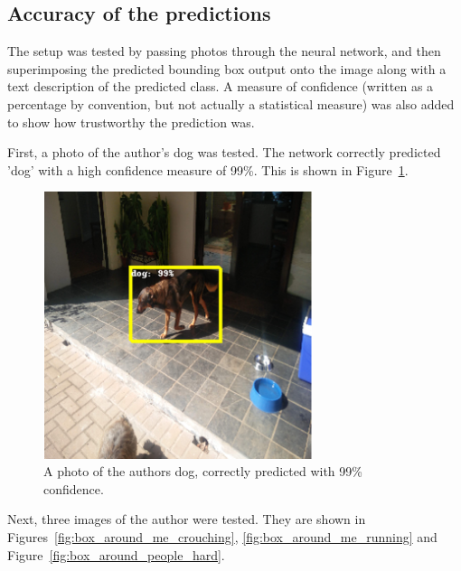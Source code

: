 \subsection{Accuracy of the predictions}

The setup was tested by passing photos through the neural network, and then superimposing the predicted bounding box output onto the image along with a text description of the predicted class. A measure of confidence (written as a percentage by convention, but not actually a statistical measure) was also added to show how trustworthy the prediction was.

First, a photo of the author's dog was tested. The network correctly predicted 'dog' with a high confidence measure of 99\%. This is shown in Figure~\ref{fig:box_around_blossom}.

\begin{figure}[h!]
  \centering
  \includegraphics[width=0.7\textwidth]{methodology/box_around_blossom}
  \caption{\label{fig:box_around_blossom}A photo of the authors dog, correctly predicted with 99\% confidence.}
\end{figure}

Next, three images of the author were tested. They are shown in Figures~\ref{fig:box_around_me_crouching}, \ref{fig:box_around_me_running} and Figure~\ref{fig:box_around_people_hard}.

